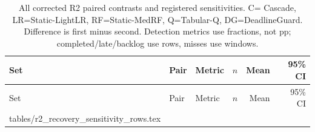 \documentclass[10pt,a4paper]{article}
\makeatletter
\newcommand{\tableinput}[1]{\@@input #1.tex }
\makeatother
\begin{document}
{\footnotesize
\setlength{\tabcolsep}{3pt}
\setcounter{table}{23}
\renewcommand{\thetable}{S\arabic{table}}
\begin{longtable}{lllrrr}
\caption{All corrected R2 paired contrasts and registered sensitivities. C= Cascade, LR=Static-LightLR, RF=Static-MedRF, Q=Tabular-Q, DG=DeadlineGuard. Difference is first minus second. Detection metrics use fractions, not pp; completed/late/backlog use rows, misses use windows.}\label{tab:s24}\\
\toprule Set & Pair & Metric & $n$ & Mean & 95\% CI\\\midrule
\endfirsthead
\toprule Set & Pair & Metric & $n$ & Mean & 95\% CI\\\midrule\endhead
\tableinput{tables/r2_recovery_sensitivity_rows}
\bottomrule
\end{longtable}}
\end{document}
